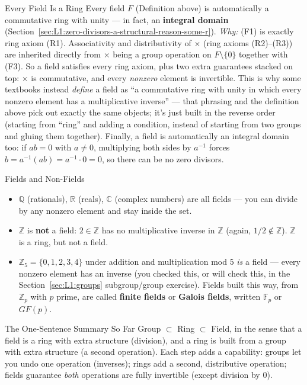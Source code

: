 \begin{factbox}{Every Field Is a Ring}
Every field $F$ (Definition above) is automatically a commutative ring with unity --- in fact, an \textbf{integral domain} (Section~\ref{sec:L1:zero-divisors-a-structural-reason-some-r}). \emph{Why:} (F1) is exactly ring axiom (R1). Associativity and distributivity of $\times$ (ring axioms (R2)--(R3)) are inherited directly from $\times$ being a group operation on $F \setminus \{0\}$ together with (F3). So a field satisfies every ring axiom, plus two extra guarantees stacked on top: $\times$ is commutative, and every \emph{nonzero} element is invertible. This is why some textbooks instead \emph{define} a field as ``a commutative ring with unity in which every nonzero element has a multiplicative inverse'' --- that phrasing and the definition above pick out exactly the same objects; it's just built in the reverse order (starting from ``ring'' and adding a condition, instead of starting from two groups and gluing them together). Finally, a field is automatically an integral domain too: if $ab=0$ with $a \ne 0$, multiplying both sides by $a^{-1}$ forces $b = a^{-1}(ab) = a^{-1}\cdot 0 = 0$, so there can be no zero divisors.
\end{factbox}

\begin{exbox}{Fields and Non-Fields}
\begin{itemize}[leftmargin=*]
  \item $\mathbb{Q}$ (rationals), $\mathbb{R}$ (reals), $\mathbb{C}$ (complex numbers) are all fields --- you can divide by any nonzero element and stay inside the set.
  \item $\mathbb{Z}$ is \textbf{not} a field: $2 \in \mathbb{Z}$ has no multiplicative inverse in $\mathbb{Z}$ (again, $1/2 \notin \mathbb{Z}$). $\mathbb{Z}$ is a ring, but not a field.
  \item $\mathbb{Z}_5 = \{0,1,2,3,4\}$ under addition and multiplication mod $5$ \emph{is} a field --- every nonzero element has an inverse (you checked this, or will check this, in the Section~\ref{sec:L1:groups} subgroup/group exercise). Fields built this way, from $\mathbb{Z}_p$ with $p$ prime, are called \textbf{finite fields} or \textbf{Galois fields}, written $\mathbb{F}_p$ or $GF(p)$.
\end{itemize}
\end{exbox}

\begin{rmkbox}{The One-Sentence Summary So Far}
Group $\subset$ Ring $\subset$ Field, in the sense that a field is a ring with extra structure (division), and a ring is built from a group with extra structure (a second operation). Each step adds a capability: groups let you undo one operation (inverses); rings add a second, distributive operation; fields guarantee \emph{both} operations are fully invertible (except division by $0$).
\end{rmkbox}

